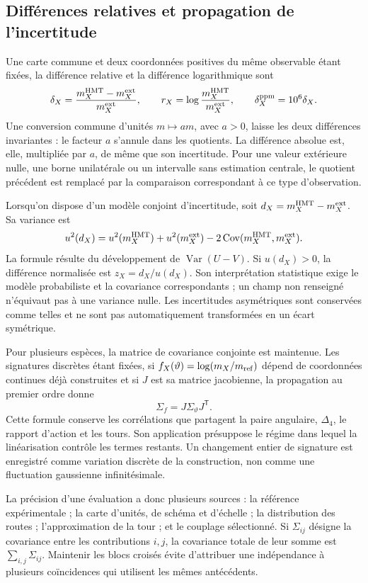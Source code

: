 \subsection{Différences relatives et propagation de l’incertitude}
\label{vi:subsec:vi-residuales}

Une carte commune et deux coordonnées positives du même observable étant fixées,
la différence relative et la différence logarithmique sont
\[
 \delta_X=\frac{m_X^{\rm HMT}-m_X^{\rm ext}}{m_X^{\rm ext}},
 \qquad r_X=\log\frac{m_X^{\rm HMT}}{m_X^{\rm ext}},
 \qquad \delta_X^{\rm ppm}=10^6\delta_X.
\]
Une conversion commune d’unités \(m\mapsto am\), avec \(a>0\),
laisse les deux différences invariantes : le facteur \(a\) s’annule dans les
quotients. La différence absolue est, elle, multipliée par \(a\), de même que
son incertitude. Pour une valeur extérieure nulle, une borne unilatérale ou un
intervalle sans estimation centrale, le quotient précédent est remplacé par
la comparaison correspondant à ce type d’observation.

Lorsqu’on dispose d’un modèle conjoint d’incertitude, soit
\(d_X=m_X^{\rm HMT}-m_X^{\rm ext}\). Sa variance est
\[
 u^2(d_X)=u^2(m_X^{\rm HMT})+u^2(m_X^{\rm ext})
          -2\operatorname{Cov}(m_X^{\rm HMT},m_X^{\rm ext}).
\]
La formule résulte du développement de
\(\operatorname{Var}(U-V)\). Si \(u(d_X)>0\), la différence
normalisée est \(z_X=d_X/u(d_X)\). Son interprétation statistique exige
le modèle probabiliste et la covariance correspondants ; un champ non
renseigné n’équivaut pas à une variance nulle. Les incertitudes asymétriques
sont conservées comme telles et ne sont pas automatiquement transformées en un écart
symétrique.

Pour plusieurs espèces, la matrice de covariance conjointe est maintenue. Les
signatures discrètes étant fixées, si \(f_X(\vartheta)=\log(m_X/m_{\rm ref})\)
dépend de coordonnées continues déjà construites et si \(J\) est sa matrice
jacobienne, la propagation au premier ordre donne
\[
 \Sigma_f=J\Sigma_\vartheta J^{\mathsf T}.
\]
Cette formule conserve les corrélations que partagent la paire angulaire,
\(\Delta_4\), le rapport d’action et les tours. Son application présuppose
le régime dans lequel la linéarisation contrôle les termes restants.
Un changement entier de signature est enregistré comme variation discrète de la
construction, non comme une fluctuation gaussienne infinitésimale.

La précision d'une évaluation a donc plusieurs sources : la
référence expérimentale ; la carte d'unités, de schéma et d'échelle ; la
distribution des routes ; l'approximation de la tour ; et le couplage
sélectionné. Si \(\Sigma_{ij}\) désigne la covariance entre les
contributions \(i,j\), la covariance totale de leur somme est
\(\sum_{i,j}\Sigma_{ij}\). Maintenir les blocs croisés évite
d'attribuer une indépendance à plusieurs coïncidences qui utilisent les mêmes
antécédents.

